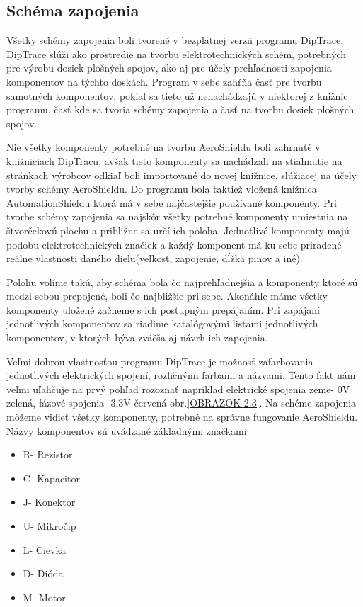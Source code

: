 \newpage


\subsection{Schéma zapojenia}

Všetky schémy zapojenia boli tvorené v bezplatnej verzii programu DipTrace. DipTrace slúži ako prostredie na tvorbu elektrotechnických schém, potrebných pre výrobu dosiek plošných spojov, ako aj pre účely prehľadnosti zapojenia komponentov na týchto doskách. Program v sebe zahŕňa časť pre tvorbu samotných komponentov, pokiaľ sa tieto už nenachádzajú v niektorej z knižníc programu, časť kde sa tvoria schémy zapojenia a časť na tvorbu dosiek plošných spojov.

Nie všetky komponenty potrebné na tvorbu AeroShieldu boli zahrnuté v knižniciach DipTracu, avšak tieto komponenty sa nachádzali na stiahnutie na stránkach výrobcov odkiaľ boli importované do novej knižnice, slúžiacej na účely tvorby schémy AeroShieldu. Do programu bola taktiež vložená knižnica AutomationShieldu ktorá má v sebe najčastejšie používané komponenty. Pri tvorbe schémy zapojenia sa najskôr všetky potrebné komponenty umiestnia na štvorčekovú plochu a približne sa určí ích poloha. Jednotlivé komponenty majú podobu elektrotechnických značiek a každý komponent má ku sebe priradené reálne vlastnosti daného dielu(veľkosť, zapojenie, dĺžka pinov a iné).

Polohu volíme takú, aby schéma bola čo najprehľadnejšia a komponenty ktoré sú medzi sebou prepojené, boli čo najbližšie pri sebe. Akonáhle máme všetky komponenty uložené začneme s ich postupným prepájaním. Pri zapájaní jednotlivých komponentov sa riadime katalógovými listami jednotlivých komponentov, v ktorých býva zväčša aj návrh ich zapojenia.

Veľmi dobrou vlastnosťou programu DipTrace je možnosť zafarbovania jednotlivých elektrických spojení, rozličnými farbami a názvami. Tento fakt nám veľmi uľahčuje na prvý pohľad rozoznať napríklad elektrické spojenia zeme- 0V zelená, fázové spojenia- 3,3V červená obr.\ref{OBRAZOK 2.3}. Na schéme zapojenia môžeme vidieť všetky komponenty, potrebné na správne fungovanie AeroShieldu. Názvy komponentov sú uvádzané základnými značkami
\begin{multicols}{3}
	\begin{itemize}
		\item R- Rezistor
		\item C- Kapacitor
		\item J- Konektor
		\item U- Mikročip
		\item L- Cievka
		\item D- Dióda
		\item M- Motor
	\end{itemize}
\end{multicols}


